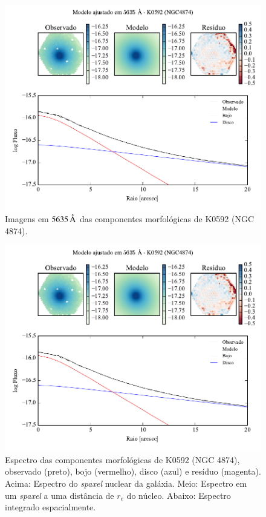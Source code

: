 \begin{figure}
	\includegraphics[page=3]{figuras-decomp/K0592_sample006a}
	\caption[Imagens em $5635\,\angstrom$ das componentes morfológicas de K0592
	(NGC 4874)]
	{Imagens em $5635\,\angstrom$ das componentes morfológicas de K0592
	(NGC 4874).}
	\label{fig:decompImages:K0592}
\end{figure}

\begin{figure}
	\includegraphics[page=4]{figuras-decomp/K0592_sample006a}
	\caption[Espectro das componentes morfológicas de K0592 (NGC 4874)]
	{Espectro das componentes morfológicas de K0592 (NGC 4874),
	observado (preto), bojo (vermelho), disco (azul) e resíduo (magenta). Acima:
	Espectro do {\em spaxel} nuclear da galáxia. Meio: Espectro em um {\em spaxel}
	a uma distância de $r_e$ do núcleo. Abaixo: Espectro integrado espacialmente.}
	\label{fig:decompSpectra:K0592}
\end{figure}

